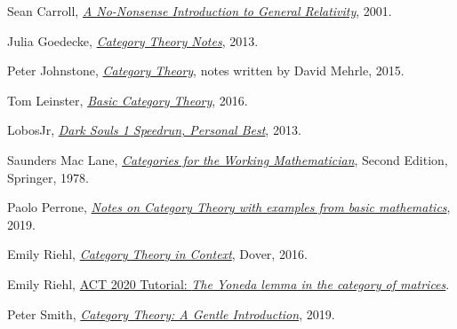 \documentclass[12pt]{article}
\theoremstyle{definition}
\theoremstyle{definition}
\theoremstyle{definition}
\numberwithin{equation}{section}
\begin{document}
\begin{thebibliography}{100}

\small
{} Sean Carroll,
\href{https://preposterousuniverse.com/wp-content/uploads/2015/08/grtinypdf.pdf}{\it A
No-Nonsense Introduction to General Relativity},  2001.

 Julia Goedecke,
\href{http://www.julia-goedecke.de/pdf/CategoryTheoryNotes.pdf}{\it Category Theory
Notes}, 2013.

 Peter Johnstone,
\href{http://pi.math.cornell.edu/~dmehrle/notes/partiii/cattheory_partiii_notes.pdf}{\it
Category Theory}, notes written by David Mehrle, 2015.

 Tom Leinster, \href{https://arxiv.org/abs/1612.09375}{\it Basic Category
Theory}, 2016.

 LobosJr, \href{https://www.youtube.com/watch?v=ImMOdTxtf-s}{\it Dark Souls
1 Speedrun, Personal Best}, 2013.

 Saunders Mac Lane,
\href{https://link.springer.com/book/10.1007%2F978-1-4757-4721-8}{\it Categories for the
Working Mathematician}, Second Edition, Springer, 1978.

 Paolo Perrone, \href{https://arxiv.org/abs/1912.10642}{\it Notes on
Category Theory with examples from basic mathematics}, 2019.

 Emily Riehl, \href{https://math.jhu.edu/~eriehl/context/}{\it Category
Theory in Context}, Dover, 2016.

 Emily Riehl, \href{https://www.youtube.com/watch?v=SsgEvrDFJsM}{ACT
2020 Tutorial: {\it The Yoneda lemma in the category of matrices}}.

 Peter Smith,
\href{https://www.logicmatters.net/2018/01/29/category-theory-a-gentle-introduction/}{\it
Category Theory: A Gentle Introduction}, 2019.

\end{thebibliography}
\end{document}
